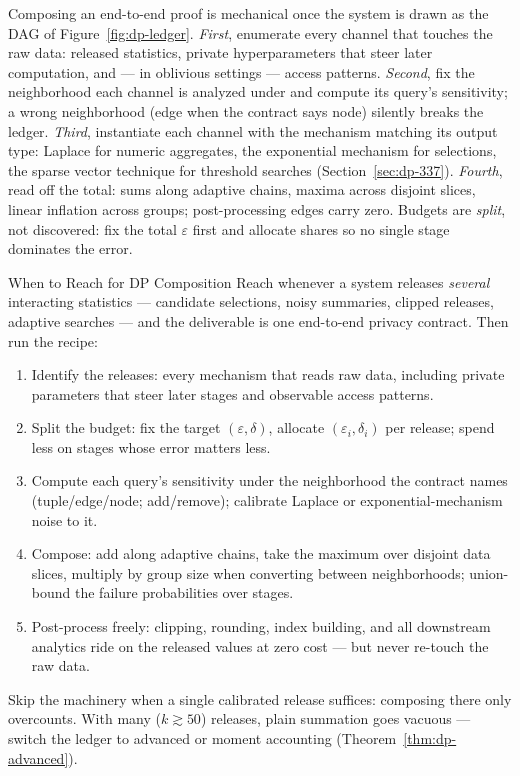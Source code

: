 Composing an end-to-end proof is mechanical once the system is drawn as the DAG of
Figure~\ref{fig:dp-ledger}. \emph{First}, enumerate every channel that touches the raw
data: released statistics, private hyperparameters that steer later computation, and
--- in oblivious settings --- access patterns. \emph{Second}, fix the neighborhood each
channel is analyzed under and compute its query's sensitivity; a wrong neighborhood
(edge when the contract says node) silently breaks the ledger. \emph{Third},
instantiate each channel with the mechanism matching its output type: Laplace for
numeric aggregates, the exponential mechanism for selections, the sparse vector
technique for threshold searches (Section~\ref{sec:dp-337}). \emph{Fourth}, read off
the total: sums along adaptive chains, maxima across disjoint slices, linear inflation
across groups; post-processing edges carry zero. Budgets are \emph{split}, not
discovered: fix the total $\varepsilon$ first and allocate shares so no single stage
dominates the error.

\begin{reachbox}{When to Reach for DP Composition}
Reach whenever a system releases \emph{several} interacting statistics --- candidate
selections, noisy summaries, clipped releases, adaptive searches --- and the
deliverable is one end-to-end privacy contract. Then run the recipe:
\begin{enumerate}
\item Identify the releases: every mechanism that reads raw data, including private
  parameters that steer later stages and observable access patterns.
\item Split the budget: fix the target $(\varepsilon,\delta)$, allocate
  $(\varepsilon_i,\delta_i)$ per release; spend less on stages whose error matters
  less.
\item Compute each query's sensitivity under the neighborhood the contract names
  (tuple/edge/node; add/remove); calibrate Laplace or exponential-mechanism noise to
  it.
\item Compose: add along adaptive chains, take the maximum over disjoint data slices,
  multiply by group size when converting between neighborhoods; union-bound the
  failure probabilities over stages.
\item Post-process freely: clipping, rounding, index building, and all downstream
  analytics ride on the released values at zero cost --- but never re-touch the raw
  data.
\end{enumerate}
Skip the machinery when a single calibrated release suffices: composing there only
overcounts. With many ($k \gtrsim 50$) releases, plain summation goes vacuous ---
switch the ledger to advanced or moment accounting (Theorem~\ref{thm:dp-advanced}).
\end{reachbox}

